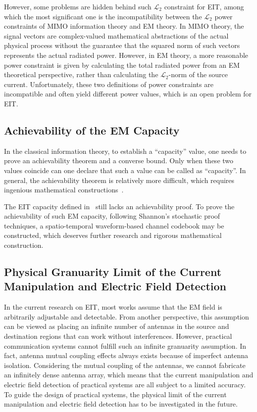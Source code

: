 \documentclass[journal,twocolumn]{IEEEtran}
\begin{document}
However, some problems are hidden behind such $\mathcal{L}_2$ constraint for EIT, among which the most significant one is the incompatibility between the $\mathcal{L}_2$ power constraints of MIMO information theory and EM theory.  
In MIMO theory, the signal vectors are complex-valued mathematical abstractions of the actual physical process without the guarantee that the squared norm of such vectors represents the actual radiated power. 
However, in EM theory, a more reasonable power constraint is given by calculating the total radiated power from an EM theoretical perspective, rather than calculating the $\mathcal{L}_2$-norm of the source current. 
Unfortunately, these two definitions of power constraints are incompatible and often yield different power values, which is an open problem for EIT. 


\subsection{Achievability of the EM Capacity}
In the classical information theory, to establish a ``capacity'' value, one needs to prove an achievability theorem and a converse bound. Only when these two values coincide can one declare that such a value can be called as ``capacity''. In general, the achievability theorem is relatively more difficult, which requires ingenious mathematical constructions~\cite{shannon1948mathematical}. 

The EIT capacity defined in~\cite{wan2022mutual,zhang2022pdma} still lacks an achievability proof. 
To prove the achievability of such EM capacity, following Shannon's stochastic proof techniques, a spatio-temporal waveform-based channel codebook may be constructed, which deserves further research and rigorous mathematical construction.  

\subsection{Physical Granuarity Limit of the Current Manipulation and Electric Field Detection}
In the current research on EIT, most works assume that the EM field is arbitrarily adjustable and detectable. From another perspective, this assumption can be viewed as placing an infinite number of antennas in the source and destination regions that can work without interferences. However, practical communication systems cannot fulfill such an infinite granuarity assumption. In fact, antenna mutual coupling effects always exists because of imperfect antenna isolation. Considering the mutual coupling of the antennas, we cannot fabricate an infinitely dense antenna array, which means that the current manipulation and electric field detection of practical systems are all subject to a limited accuracy. To guide the design of practical systems, the physical limit of the current manipulation and electric field detection has to be investigated in the future. 
\end{document}
